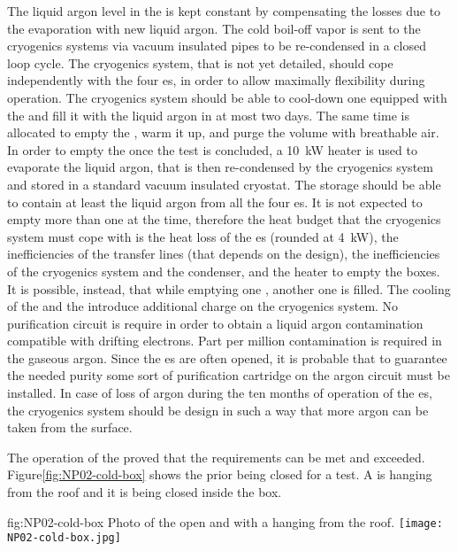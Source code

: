 The liquid argon level in the  \coldbox is kept constant by compensating the losses due to the evaporation with new liquid argon.
The cold boil-off vapor is sent to the cryogenics systems via vacuum insulated pipes to be re-condensed in a closed loop cycle.
The cryogenics system, that is not yet detailed, should cope independently with the four  \coldbox{}es, in order to allow maximally flexibility during operation.
The cryogenics system should be able to cool-down one  \coldbox equipped with the  and fill it with the liquid argon in at most two days.
The same time is allocated to empty the \coldbox, warm it up, and purge the volume with breathable air.
In order to empty the  \coldbox once the test is concluded, a 10~kW heater is used to evaporate the liquid argon, that is then re-condensed by the cryogenics system and stored in a standard vacuum insulated cryostat.
The storage should be able to contain at least the liquid argon from all the four  \coldbox{}es.
It is not expected to empty more than one  \coldbox at the time, therefore the heat budget that the cryogenics system must cope with is the heat loss of the  \coldbox{}es (rounded at 4~kW), the inefficiencies of the transfer lines (that depends on the design), the inefficiencies of the cryogenics system and the condenser, and the heater to empty the boxes.
It is possible, instead, that while emptying one  \coldbox, another one is filled.
The cooling of the  \coldbox and the  introduce additional charge on the cryogenics system.
No purification circuit is require in order to obtain a liquid argon contamination compatible with drifting electrons.
Part per million contamination is required in the gaseous argon.
Since the  \coldbox{}es are often opened, it is probable that to guarantee the needed purity some sort of purification cartridge on the argon circuit must be installed.
In case of loss of argon during the ten months of operation of the  \coldbox{}es, the cryogenics system should be design in such a way that more argon can be taken from the surface.

The operation of the   \coldbox proved that the requirements can be met and exceeded.
Figure\ref{fig:NP02-cold-box} shows the   \coldbox prior being closed for a test.
A  is hanging from the roof and it is being closed inside the box.
\begin{dunefigure}{fig:NP02-cold-box}
{Photo of the  \coldbox open and with a  hanging from the roof.}
\texttt{[image: NP02-cold-box.jpg]}
\end{dunefigure}

